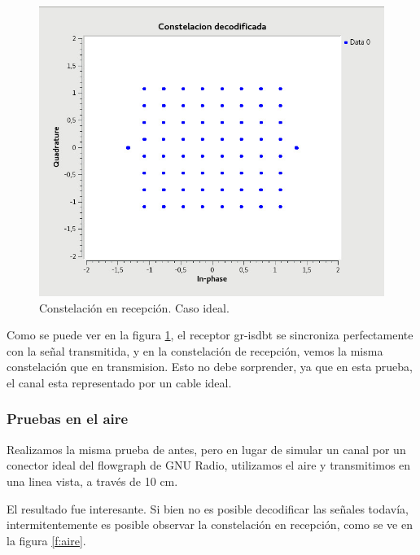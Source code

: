 \begin{figure}[!h]
	\centering
	\includegraphics[scale=0.5]{figuras/cap06/const_rec}
	\caption{\label{f:const_rec} Constelación en recepción. Caso ideal.}
\end{figure}

Como se puede ver en la figura \ref{f:const_rec}, el receptor gr-isdbt se sincroniza perfectamente con la señal transmitida, y en la constelación de recepción, vemos la misma constelación que en transmision. Esto no debe sorprender, ya que en esta prueba, el canal esta representado por un cable ideal. 

\subsubsection{Pruebas en el aire}

Realizamos la misma prueba de antes, pero en lugar de simular un canal por un conector ideal del flowgraph de GNU Radio, utilizamos el aire y transmitimos en una linea vista, a través de 10 cm. 

El resultado fue interesante. Si bien no es posible decodificar las señales todavía, intermitentemente es posible observar la constelación en recepción, como se ve en la figura \ref{f:aire}. 

